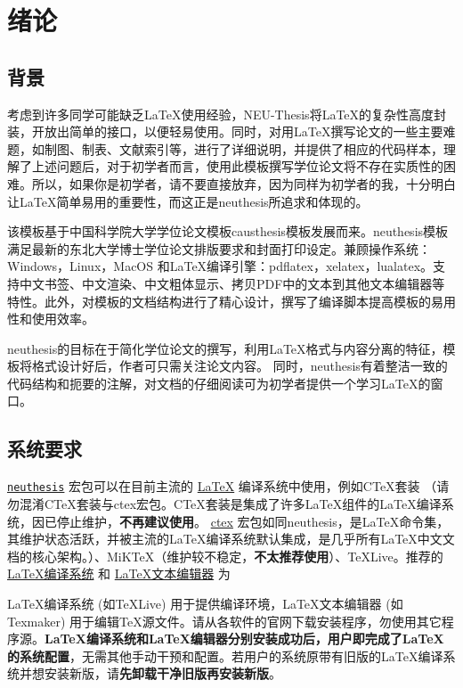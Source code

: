 \chapter{绪论}\label{chap:introduction}

\section{背景}

考虑到许多同学可能缺乏\LaTeX{}使用经验，NEU-Thesis将\LaTeX{}的复杂性高度封装，开放出简单的接口，以便轻易使用。同时，对用\LaTeX{}撰写论文的一些主要难题，如制图、制表、文献索引等，进行了详细说明，并提供了相应的代码样本，理解了上述问题后，对于初学者而言，使用此模板撰写学位论文将不存在实质性的困难。所以，如果你是初学者，请不要直接放弃，因为同样为初学者的我，十分明白让\LaTeX{}简单易用的重要性，而这正是neuthesis所追求和体现的。

该模板基于中国科学院大学学位论文模板causthesis模板发展而来。neuthesis模板满足最新的东北大学博士学位论文排版要求和封面打印设定。兼顾操作系统：Windows，Linux，MacOS 和\LaTeX{}编译引擎：pdflatex，xelatex，lualatex。支持中文书签、中文渲染、中文粗体显示、拷贝PDF中的文本到其他文本编辑器等特性。此外，对模板的文档结构进行了精心设计，撰写了编译脚本提高模板的易用性和使用效率。

neuthesis的目标在于简化学位论文的撰写，利用\LaTeX{}格式与内容分离的特征，模板将格式设计好后，作者可只需关注论文内容。 同时，neuthesis有着整洁一致的代码结构和扼要的注解，对文档的仔细阅读可为初学者提供一个学习\LaTeX{}的窗口。

\section{系统要求}\label{sec:system}

\href{https://github.com/mervin0502/neuthesis}{\texttt{neuthesis}} 宏包可以在目前主流的 \href{https://en.wikibooks.org/wiki/LaTeX/Introduction}{\LaTeX{}} 编译系统中使用，例如C\TeX{}套装 （请勿混淆C\TeX{}套装与ctex宏包。C\TeX{}套装是集成了许多\LaTeX{}组件的\LaTeX{}编译系统，因已停止维护，\textbf{不再建议使用}。 \href{https://ctan.org/pkg/ctex?lang=en}{ctex} 宏包如同neuthesis，是\LaTeX{}命令集，其维护状态活跃，并被主流的\LaTeX{}编译系统默认集成，是几乎所有\LaTeX{}中文文档的核心架构。）、MiK\TeX{}（维护较不稳定，\textbf{不太推荐使用}）、\TeX{}Live。推荐的 \href{https://en.wikibooks.org/wiki/LaTeX/Installation}{\LaTeX{}编译系统} 和 \href{https://en.wikibooks.org/wiki/LaTeX/Installation}{\LaTeX{}文本编辑器} 为

\LaTeX{}编译系统 (如\TeX{}Live) 用于提供编译环境，\LaTeX{}文本编辑器 (如Texmaker) 用于编辑\TeX{}源文件。请从各软件的官网下载安装程序，勿使用其它程序源。\textbf{\LaTeX{}编译系统和\LaTeX{}编辑器分别安装成功后，用户即完成了\LaTeX{}的系统配置}，无需其他手动干预和配置。若用户的系统原带有旧版的\LaTeX{}编译系统并想安装新版，请\textbf{先卸载干净旧版再安装新版}。

